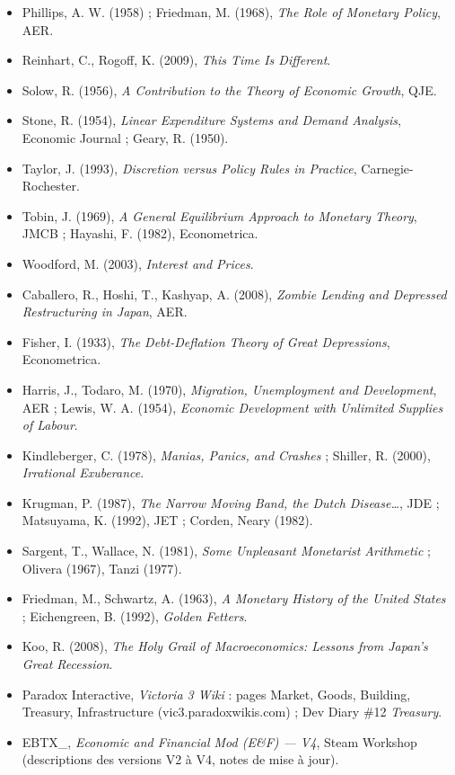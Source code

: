 \documentclass[11pt,a4paper]{article}
\begin{document}
\begin{itemize}
\item Phillips, A. W. (1958) ; Friedman, M. (1968), \emph{The Role of Monetary Policy}, AER.
\item Reinhart, C., Rogoff, K. (2009), \emph{This Time Is Different}.
\item Solow, R. (1956), \emph{A Contribution to the Theory of Economic Growth}, QJE.
\item Stone, R. (1954), \emph{Linear Expenditure Systems and Demand Analysis}, Economic Journal ; Geary, R. (1950).
\item Taylor, J. (1993), \emph{Discretion versus Policy Rules in Practice}, Carnegie-Rochester.
\item Tobin, J. (1969), \emph{A General Equilibrium Approach to Monetary Theory}, JMCB ; Hayashi, F. (1982), Econometrica.
\item Woodford, M. (2003), \emph{Interest and Prices}.
\item Caballero, R., Hoshi, T., Kashyap, A. (2008), \emph{Zombie Lending and Depressed Restructuring in Japan}, AER.
\item Fisher, I. (1933), \emph{The Debt-Deflation Theory of Great Depressions}, Econometrica.
\item Harris, J., Todaro, M. (1970), \emph{Migration, Unemployment and Development}, AER ; Lewis, W. A. (1954), \emph{Economic Development with Unlimited Supplies of Labour}.
\item Kindleberger, C. (1978), \emph{Manias, Panics, and Crashes} ; Shiller, R. (2000), \emph{Irrational Exuberance}.
\item Krugman, P. (1987), \emph{The Narrow Moving Band, the Dutch Disease\ldots}, JDE ; Matsuyama, K. (1992), JET ; Corden, Neary (1982).
\item Sargent, T., Wallace, N. (1981), \emph{Some Unpleasant Monetarist Arithmetic} ; Olivera (1967), Tanzi (1977).
\item Friedman, M., Schwartz, A. (1963), \emph{A Monetary History of the United States} ; Eichengreen, B. (1992), \emph{Golden Fetters}.
\item Koo, R. (2008), \emph{The Holy Grail of Macroeconomics: Lessons from Japan's Great Recession}.
\item Paradox Interactive, \emph{Victoria 3 Wiki} : pages Market, Goods, Building, Treasury, Infrastructure (vic3.paradoxwikis.com) ; Dev Diary \#12 \emph{Treasury}.
\item EBTX\_, \emph{Economic and Financial Mod (E\&F) --- V4}, Steam Workshop (descriptions des versions V2 à V4, notes de mise à jour).
\end{itemize}
\end{document}
